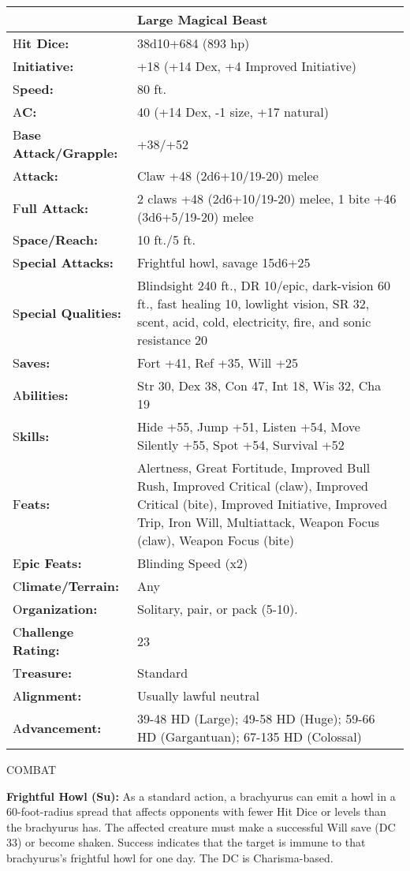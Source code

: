\documentclass{article}
\begin{document}
\begin{tabular}{|>{\raggedright}p{63pt}|>{\raggedright}p{263pt}|}
\hline
  & Large Magical Beast \tabularnewline
\hline
H\textbf{it Dice:} &  38d10+684 (893 hp) \tabularnewline
\hline
I\textbf{nitiative:} &  +18 (+14 Dex, +4 Improved Initiative) \tabularnewline
\hline
S\textbf{peed:} &  80 ft. \tabularnewline
\hline
A\textbf{C:} &  40 (+14 Dex, -1 size, +17 natural) \tabularnewline
\hline
B\textbf{ase Attack/Grapple:} &  +38/+52\textbf{ }\tabularnewline
\hline
A\textbf{ttack:} &  Claw +48 (2d6+10/19-20) melee\tabularnewline
\hline
F\textbf{ull Attack:} &  2 claws +48 (2d6+10/19-20) melee, 1 bite +46 (3d6+5/19-20) 
melee\tabularnewline
\hline
S\textbf{pace/Reach:} &  10 ft./5 ft. \tabularnewline
\hline
S\textbf{pecial Attacks:} &  Frightful howl, savage 15d6+25 \tabularnewline
\hline
S\textbf{pecial Qualities:} &  Blindsight 240 ft., DR 10/epic, dark-vision 60 ft., 
fast healing 10, lowlight vision, SR 32, scent, acid, cold, electricity, fire, 
and sonic resistance 20 \tabularnewline
\hline
S\textbf{aves:} &  Fort +41, Ref +35, Will +25 \tabularnewline
\hline
A\textbf{bilities:} &  Str 30, Dex 38, Con 47, Int 18, Wis 32, Cha 19 \tabularnewline
\hline
S\textbf{kills:} & Hide +55, Jump +51, Listen +54, Move Silently +55, Spot +54, 
Survival +52\tabularnewline
\hline
F\textbf{eats:} &  Alertness, Great Fortitude, Improved Bull Rush, Improved Critical 
(claw), Improved Critical (bite), Improved Initiative, Improved Trip, Iron Will, 
Multiattack, Weapon Focus (claw), Weapon Focus (bite) \tabularnewline
\hline
E\textbf{pic Feats:} &  Blinding Speed (x2) \tabularnewline
\hline
C\textbf{limate/Terrain:} &  Any \tabularnewline
\hline
O\textbf{rganization:} &  Solitary, pair, or pack (5-10). \tabularnewline
\hline
C\textbf{hallenge Rating:} &  23 \tabularnewline
\hline
T\textbf{reasure:} &  Standard \tabularnewline
\hline
A\textbf{lignment:} &  Usually lawful neutral \tabularnewline
\hline
A\textbf{dvancement:} &  39-48 HD (Large); 49-58 HD (Huge); 59-66 HD (Gargantuan); 
67-135 HD (Colossal) \tabularnewline
\hline
\end{tabular}

COMBAT\textbf{ }

\textbf{Frightful Howl (Su):} As a standard action, a brachyurus can emit a howl 
in a 60-foot-radius spread that affects opponents with fewer Hit Dice or levels 
than the brachyurus has. The affected creature must make a successful Will save 
(DC 33) or become shaken. Success indicates that the target is immune to that brachyurus's 
frightful howl for one day. The DC is Charisma-based.
\end{document}
